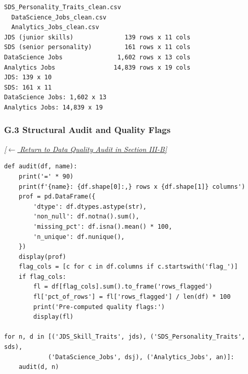 \documentclass[conference]{IEEEtran}
\begin{document}
\begin{lstlisting}[style=outputstyle,caption={Execution Output G.2: Dataset Load Dimensions.},label={out:loading}]
SDS_Personality_Traits_clean.csv
  DataScience_Jobs_clean.csv
  Analytics_Jobs_clean.csv
JDS (junior skills)              139 rows x 11 cols
SDS (senior personality)         161 rows x 11 cols
DataScience Jobs               1,602 rows x 13 cols
Analytics Jobs                14,839 rows x 19 cols
JDS: 139 x 10
SDS: 161 x 11
DataScience Jobs: 1,602 x 13
Analytics Jobs: 14,839 x 19
\end{lstlisting}

\subsubsection*{G.3 Structural Audit and Quality Flags}
\label{lst:audit}
\textit{\hyperref[sec:data_quality]{[$\leftarrow$ Return to Data Quality Audit in Section III-B]}}

\begin{lstlisting}[style=pythonstyle,caption={Comprehensive structural audit and pre-computed quality flag inspection.},label={lst:audit_code}]
def audit(df, name):
    print('=' * 90)
    print(f'{name}: {df.shape[0]:,} rows x {df.shape[1]} columns')
    prof = pd.DataFrame({
        'dtype': df.dtypes.astype(str),
        'non_null': df.notna().sum(),
        'missing_pct': df.isna().mean() * 100,
        'n_unique': df.nunique(),
    })
    display(prof)
    flag_cols = [c for c in df.columns if c.startswith('flag_')]
    if flag_cols:
        fl = df[flag_cols].sum().to_frame('rows_flagged')
        fl['pct_of_rows'] = fl['rows_flagged'] / len(df) * 100
        print('Pre-computed quality flags:')
        display(fl)

for n, d in [('JDS_Skill_Traits', jds), ('SDS_Personality_Traits', sds),
            ('DataScience_Jobs', dsj), ('Analytics_Jobs', an)]:
    audit(d, n)
\end{lstlisting}
\end{document}
